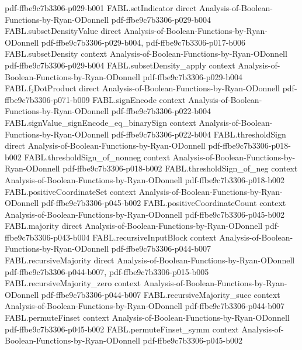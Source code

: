 \begin{theorem}
  {pdf-ffbe9c7b3306-p029-b001}
\proofstep
  {FABL.setIndicator}
  {direct}
  {Analysis-of-Boolean-Functions-by-Ryan-ODonnell}
  {pdf-ffbe9c7b3306-p029-b004}
\proofstep
  {FABL.subsetDensityValue}
  {direct}
  {Analysis-of-Boolean-Functions-by-Ryan-ODonnell}
  {pdf-ffbe9c7b3306-p029-b004,
    pdf-ffbe9c7b3306-p017-b006}
\proofstep
  {FABL.subsetDensity}
  {context}
  {Analysis-of-Boolean-Functions-by-Ryan-ODonnell}
  {pdf-ffbe9c7b3306-p029-b004}
\proofstep
  {FABL.subsetDensity_apply}
  {context}
  {Analysis-of-Boolean-Functions-by-Ryan-ODonnell}
  {pdf-ffbe9c7b3306-p029-b004}
\proofstep
  {FABL.f₂DotProduct}
  {direct}
  {Analysis-of-Boolean-Functions-by-Ryan-ODonnell}
  {pdf-ffbe9c7b3306-p071-b009}
\proofstep
  {FABL.signEncode}
  {context}
  {Analysis-of-Boolean-Functions-by-Ryan-ODonnell}
  {pdf-ffbe9c7b3306-p022-b004}
\proofstep
  {FABL.signValue_signEncode_eq_binarySign}
  {context}
  {Analysis-of-Boolean-Functions-by-Ryan-ODonnell}
  {pdf-ffbe9c7b3306-p022-b004}
\proofstep
  {FABL.thresholdSign}
  {direct}
  {Analysis-of-Boolean-Functions-by-Ryan-ODonnell}
  {pdf-ffbe9c7b3306-p018-b002}
\proofstep
  {FABL.thresholdSign_of_nonneg}
  {context}
  {Analysis-of-Boolean-Functions-by-Ryan-ODonnell}
  {pdf-ffbe9c7b3306-p018-b002}
\proofstep
  {FABL.thresholdSign_of_neg}
  {context}
  {Analysis-of-Boolean-Functions-by-Ryan-ODonnell}
  {pdf-ffbe9c7b3306-p018-b002}
\proofstep
  {FABL.positiveCoordinateSet}
  {context}
  {Analysis-of-Boolean-Functions-by-Ryan-ODonnell}
  {pdf-ffbe9c7b3306-p045-b002}
\proofstep
  {FABL.positiveCoordinateCount}
  {context}
  {Analysis-of-Boolean-Functions-by-Ryan-ODonnell}
  {pdf-ffbe9c7b3306-p045-b002}
\proofstep
  {FABL.majority}
  {direct}
  {Analysis-of-Boolean-Functions-by-Ryan-ODonnell}
  {pdf-ffbe9c7b3306-p043-b004}
\proofstep
  {FABL.recursiveInputBlock}
  {context}
  {Analysis-of-Boolean-Functions-by-Ryan-ODonnell}
  {pdf-ffbe9c7b3306-p044-b007}
\proofstep
  {FABL.recursiveMajority}
  {direct}
  {Analysis-of-Boolean-Functions-by-Ryan-ODonnell}
  {pdf-ffbe9c7b3306-p044-b007,
    pdf-ffbe9c7b3306-p015-b005}
\proofstep
  {FABL.recursiveMajority_zero}
  {context}
  {Analysis-of-Boolean-Functions-by-Ryan-ODonnell}
  {pdf-ffbe9c7b3306-p044-b007}
\proofstep
  {FABL.recursiveMajority_succ}
  {context}
  {Analysis-of-Boolean-Functions-by-Ryan-ODonnell}
  {pdf-ffbe9c7b3306-p044-b007}
\proofstep
  {FABL.permuteFinset}
  {context}
  {Analysis-of-Boolean-Functions-by-Ryan-ODonnell}
  {pdf-ffbe9c7b3306-p045-b002}
\proofstep
  {FABL.permuteFinset_symm}
  {context}
  {Analysis-of-Boolean-Functions-by-Ryan-ODonnell}
  {pdf-ffbe9c7b3306-p045-b002}

\end{theorem}
